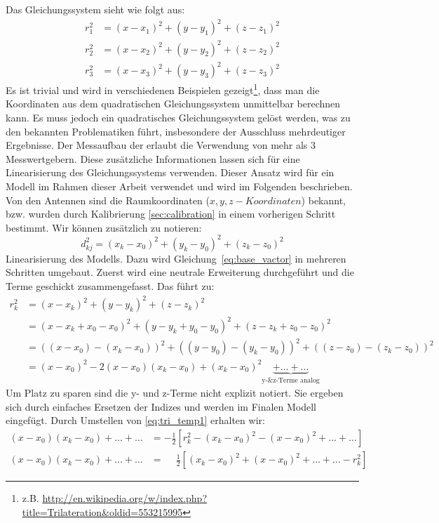 %
Das Gleichungssystem sieht wie folgt aus:
%
\begin{align}
	r_{1}^2 &= (x-x_1)^2+(y-y_1)^2+(z-z_1)^2 \nonumber\\
	r_{2}^2 &= (x-x_2)^2+(y-y_2)^2+(z-z_2)^2 \nonumber\\
	r_{3}^2 &= (x-x_3)^2+(y-y_3)^2+(z-z_3)^2 \nonumber
%	
\end{align}
%
Es ist trivial und wird in verschiedenen Beispielen gezeigt\footnote{z.B. \url{http://en.wikipedia.org/w/index.php?title=Trilateration&oldid=553215995}}, dass man die Koordinaten aus dem quadratischen Gleichungssystem unmittelbar berechnen kann. Es muss jedoch ein quadratisches Gleichungssystem gelöst werden, was zu den bekannten Problematiken führt, insbesondere der Ausschluss mehrdeutiger Ergebnisse. Der Messaufbau der \amedogmbh erlaubt die Verwendung von mehr als 3 Messwertgebern. Diese zusätzliche Informationen lassen sich für eine Linearisierung des Gleichungssystems verwenden. Dieser Ansatz wird für ein Modell im Rahmen dieser Arbeit verwendet und wird im Folgenden beschrieben.\\
%
Von den Antennen sind die Raumkoordinaten ($x,y,z-Koordinaten$) bekannt, bzw. wurden durch Kalibrierung \ref{sec:calibration} in einem vorherigen Schritt bestimmt. Wir können zusätzlich zu notieren:
%
\begin{equation}\label{eq:d_k0}
	d_{kj}^2= (x_k-x_0)^2+(y_k-y_0)^2+(z_k-z_0)^2
\end{equation}
%
Linearisierung des Modells. Dazu wird Gleichung~\ref{eq:base_vactor} in mehreren Schritten umgebaut. Zuerst wird eine neutrale Erweiterung durchgeführt und die Terme geschickt zusammengefasst. Das führt zu:
%
\begin{align}
	r_{k}^2 &= (x-x_k)^2+(y-y_k)^2+(z-z_k)^2 \nonumber \\
	&=(x-x_k+x_0-x_0)^2+(y-y_k+y_0-y_0)^2+(z-z_k+z_0-z_0)^2 \nonumber \\
	&=((x-x_0)-(x_k-x_0))^2+((y-y_0)-(y_k-y_0))^2+((z-z_0)-(z_k-z_0))^2 \nonumber \\ 
	&=(x-x_0)^2-2(x-x_0)(x_k-x_0)+(x_k-x_0)^2\underbrace{+\dots{}+\dots{}}_\text{y-\& z-Terme analog}
	\label{eq:tri_temp1}
%
\end{align}
%
Um Platz zu sparen sind die y- und z-Terme nicht explizit notiert. Sie ergeben sich durch einfaches Ersetzen der Indizes und werden im Finalen Modell eingefügt. Durch Umstellen von \eqref{eq:tri_temp1} erhalten wir:
\begin{align}
(x-x_0)(x_k-x_0)+\dots{}+\dots{}&=-\frac{1}{2}[r_k^2-(x_k-x_0)^2 -(x-x_0)^2 +\dots{} +\dots{}]\nonumber\\
(x-x_0)(x_k-x_0)+\dots{}+\dots{}&=\phantom{-}\frac{1}{2}[(x_k-x_0)^2 +(x-x_0)^2 +\dots{}+\dots{}-r_k^2]\nonumber
%
\end{align}
